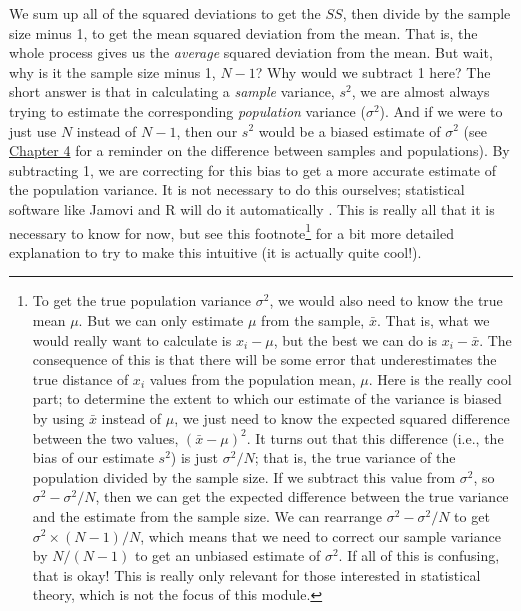 \documentclass[
]{scrbook}
\begin{document}
We sum up all of the squared deviations to get the \(SS\), then divide by the sample size minus 1, to get the mean squared deviation from the mean.
That is, the whole process gives us the \emph{average} squared deviation from the mean.
But wait, why is it the sample size minus 1, \(N - 1\)?
Why would we subtract 1 here?
The short answer is that in calculating a \emph{sample} variance, \(s^{2}\), we are almost always trying to estimate the corresponding \emph{population} variance (\(\sigma^{2}\)).
And if we were to just use \(N\) instead of \(N - 1\), then our \(s^{2}\) would be a biased estimate of \(\sigma^{2}\) (see \protect\hyperlink{Chapter_4}{Chapter 4} for a reminder on the difference between samples and populations).
By subtracting 1, we are correcting for this bias to get a more accurate estimate of the population variance.
It is not necessary to do this ourselves; statistical software like Jamovi and R will do it automatically \citep{Jamovi2022, Rproject}.
This is really all that it is necessary to know for now, but see this footnote\footnote{To get the true population variance \(\sigma^{2}\), we would also need to know the true mean \(\mu\). But we can only estimate \(\mu\) from the sample, \(\bar{x}\). That is, what we would really want to calculate is \(x_{i} - \mu\), but the best we can do is \(x_{i} - \bar{x}\). The consequence of this is that there will be some error that underestimates the true distance of \(x_{i}\) values from the population mean, \(\mu\). Here is the really cool part; to determine the extent to which our estimate of the variance is biased by using \(\bar{x}\) instead of \(\mu\), we just need to know the expected squared difference between the two values, \((\bar{x} - \mu)^{2}\). It turns out that this difference (i.e., the bias of our estimate \(s^{2}\)) is just \(\sigma^{2} / N\); that is, the true variance of the population divided by the sample size. If we subtract this value from \(\sigma^{2}\), so \(\sigma^{2} - \sigma^{2}/N\), then we can get the expected difference between the true variance and the estimate from the sample size. We can rearrange \(\sigma^{2} - \sigma^{2}/N\) to get \(\sigma^{2} \times (N - 1)/N\), which means that we need to correct our sample variance by \(N / (N-1)\) to get an unbiased estimate of \(\sigma^{2}\). If all of this is confusing, that is okay! This is really only relevant for those interested in statistical theory, which is not the focus of this module.} for a bit more detailed explanation to try to make this intuitive (it is actually quite cool!).
\end{document}
